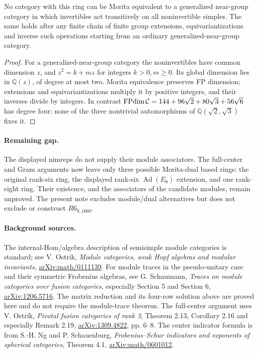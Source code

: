 \begin{corollary}
No category with this ring can be Morita equivalent to a generalized
near-group category in which invertibles act transitively on all
noninvertible simples. The same holds after any finite chain of finite
group extensions, equivariantizations and inverse such operations
starting from an ordinary generalized-near-group category.
\end{corollary}
\begin{proof}
For a generalized-near-group category the noninvertibles have common
dimension $z$, and $z^2=k+mz$ for integers $k>0,m\geq0$. Its global
dimension lies in $\mathbb Q(z)$, of degree at most two. Morita
equivalence preserves FP dimension; extensions and equivariantizations
multiply it by positive integers, and their inverses divide by integers.
In contrast $\operatorname{FPdim}\mathcal C=144+96\sqrt2+80\sqrt3+56\sqrt6$ has degree four:
none of the three nontrivial automorphisms of
$\mathbb Q(\sqrt2,\sqrt3)$ fixes it.
\end{proof}

\paragraph{Remaining gap.}
The displayed nimreps do not supply their module associators.
The full-center and Gram arguments now leave only three possible
Morita-dual based rings: the original rank-six ring, the displayed
rank-six $\operatorname{Ad}(E_6)$ extension, and one rank-eight ring.
Their existence, and the associators of the candidate modules, remain
unproved. The present note excludes module/dual alternatives but does
not exclude or construct $R6_{8,1660}$.

\paragraph{Background sources.}
The internal-Hom/algebra description of semisimple module categories is
standard; see V. Ostrik, \emph{Module categories, weak Hopf algebras and
modular invariants}, \href{https://arxiv.org/abs/math/0111139}{arXiv:math/0111139}.
For module traces in the pseudo-unitary case and their symmetric
Frobenius algebras, see G. Schaumann, \emph{Traces on module categories
over fusion categories}, especially Section 5 and Section 6,
\href{https://arxiv.org/abs/1206.5716}{arXiv:1206.5716}.
The matrix reduction and its four-row solution above are proved here
and do not require the module-trace theorem.
The full-center argument uses V. Ostrik, \emph{Pivotal fusion categories
of rank 3}, Theorem 2.13, Corollary 2.16 and especially Remark 2.19,
\href{https://arxiv.org/abs/1309.4822}{arXiv:1309.4822}, pp. 6--8.
The center indicator formula is from S.-H. Ng and P. Schauenburg,
\emph{Frobenius--Schur indicators and exponents of spherical categories},
Theorem 4.1, \href{https://arxiv.org/abs/math/0601012}{arXiv:math/0601012}.

